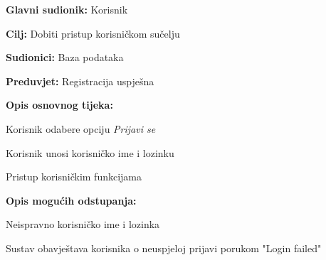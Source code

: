      \noindent {}
					\begin{packed_item}
	
						\item \textbf{Glavni sudionik: } Korisnik
						\item  \textbf{Cilj:} Dobiti pristup korisničkom sučelju
						\item  \textbf{Sudionici:} Baza podataka
						\item  \textbf{Preduvjet:} Registracija uspješna
						\item  \textbf{Opis osnovnog tijeka:}
						
						\item[] \begin{packed_enum}
	
							\item Korisnik odabere opciju \textit{Prijavi se}
							\item Korisnik unosi korisničko ime i lozinku
							\item Pristup korisničkim funkcijama
						\end{packed_enum}
						
						\item  \textbf{Opis mogućih odstupanja:}
						
						\item[] \begin{packed_item}
	
							\item[1.] Neispravno korisničko ime i lozinka

							\item[] \begin{packed_enum}
								
								\item Sustav obavještava korisnika o neuspjeloj prijavi porukom "Login failed"
								
							\end{packed_enum}
							
						\end{packed_item}
					\end{packed_item}

